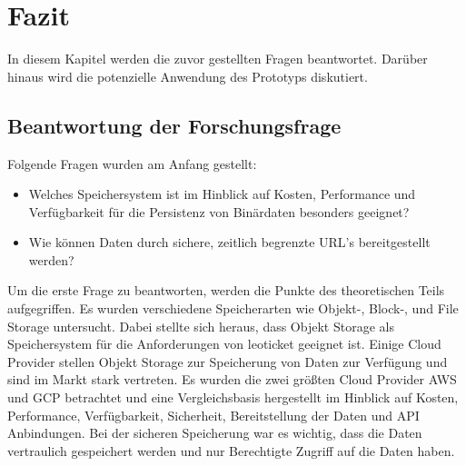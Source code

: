 \chapter{Fazit}

In diesem Kapitel werden die zuvor gestellten Fragen beantwortet. Darüber hinaus wird die potenzielle Anwendung des Prototyps diskutiert.

\section{Beantwortung der Forschungsfrage}

Folgende Fragen wurden am Anfang gestellt:

\begin{itemize}
	\item Welches Speichersystem ist im Hinblick auf Kosten, Performance und Verfügbarkeit für die Persistenz von Binärdaten besonders geeignet? 
	\item Wie können Daten durch sichere, zeitlich begrenzte URL's bereitgestellt werden?
\end{itemize}

Um die erste Frage zu beantworten, werden die Punkte des theoretischen Teils aufgegriffen. Es wurden verschiedene Speicherarten wie Objekt-, Block-, und File Storage untersucht. Dabei stellte sich heraus, dass Objekt Storage als Speichersystem für die Anforderungen von leoticket geeignet ist. Einige Cloud Provider stellen Objekt Storage zur Speicherung von Daten zur Verfügung und sind im Markt stark vertreten. Es wurden die zwei größten Cloud Provider AWS und GCP betrachtet und eine Vergleichsbasis hergestellt im Hinblick auf Kosten, Performance, Verfügbarkeit, Sicherheit, Bereitstellung der Daten und API Anbindungen. Bei der sicheren Speicherung war es wichtig, dass die Daten vertraulich gespeichert werden und nur Berechtigte Zugriff auf die Daten haben.\\

